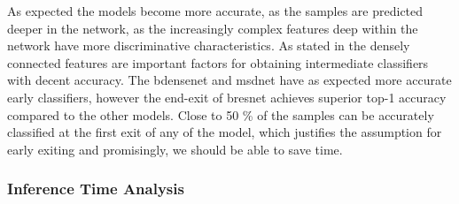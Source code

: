 As expected the models become more accurate, as the samples are predicted deeper in the network, as the increasingly complex features deep within the network have more discriminative characteristics. As stated in \cite{huang_multi-scale_2017} the densely connected features are important factors for obtaining intermediate classifiers with decent accuracy. The \gls{bdensenet} and \gls{msdnet} have as expected more accurate early classifiers, however the end-exit of \gls{bresnet} achieves superior top-1 accuracy compared to the other models. Close to 50 \% of the samples can be accurately classified at the first exit of any of the model, which justifies the assumption for early exiting and promisingly, we should be able to save time. 

\subsubsection{Inference Time Analysis}

